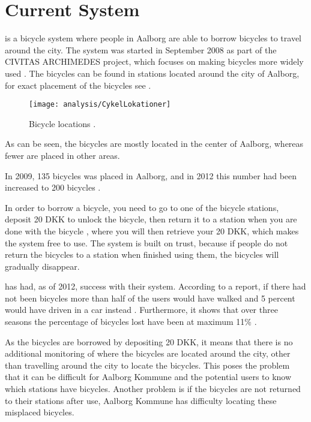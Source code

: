 \section{Current System}


\bycykel is a bicycle system where people in Aalborg are able to borrow bicycles to travel around the city.
The system was started in September 2008 as part of the CIVITAS ARCHIMEDES project, which focuses on making bicycles more widely used \citep{misc:aalborgcykling}.
The bicycles can be found in stations located around the city of Aalborg, for exact placement of the bicycles see .

\begin{figure}[h]
	\centering
	\texttt{[image: analysis/CykelLokationer]}
	\caption{Bicycle locations \citep{misc:aalborgbycykel}.}
	\label{fig:CykelLokationer}
\end{figure}

As can be seen, the bicycles are mostly located in the center of Aalborg, whereas fewer are placed in other areas.

In 2009, 135 bicycles was placed in Aalborg, and in 2012 this number had been increased to 200 bicycles \citep{misc:aalborgcykling}.

In order to borrow a bicycle, you need to go to one of the bicycle stations, deposit 20 DKK to unlock the bicycle, then return it to a station when you are done with the bicycle \citep{misc:aalborgbycykelregler}, where you will then retrieve your 20 DKK, which makes the system free to use.
The system is built on trust, because if people do not return the bicycles to a station when finished using them, the bicycles will gradually disappear.

\bycykel has had, as of 2012, success with their system. 
According to a report, if there had not been bicycles more than half of the users would have walked and 5 percent would have driven in a car instead \citep{misc:aalborgcykling}.
Furthermore, it shows that over three seasons the percentage of bicycles lost have been at maximum 11\% \citep{misc:aalborgcykling}.

As the bicycles are borrowed by depositing 20 DKK, it means that there is no additional monitoring of where the bicycles are located around the city, other than travelling around the city to locate the bicycles.
This poses the problem that it can be difficult for Aalborg Kommune and the potential users to know which stations have bicycles.
Another problem is if the bicycles are not returned to their stations after use, Aalborg Kommune has difficulty locating these misplaced bicycles.

